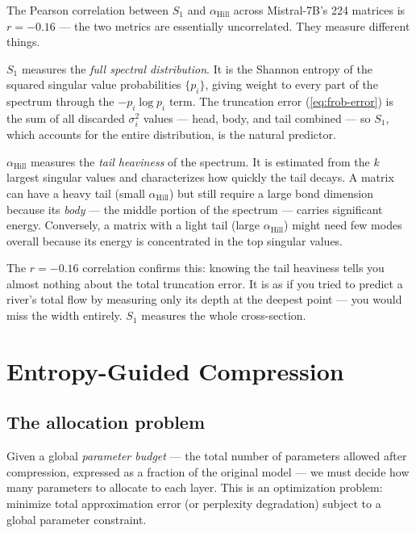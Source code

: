 \documentclass[11pt,a4paper]{article}
\newcommand{\Svn}{S_1}
\begin{document}
The Pearson correlation between $\Svn$ and $\alpha_{\text{Hill}}$
across Mistral-7B's 224 matrices is $r = -0.16$ --- the two metrics
are essentially uncorrelated.  They measure different things.

$\Svn$ measures the \emph{full spectral distribution}.  It is the
Shannon entropy of the squared singular value probabilities
$\{p_i\}$, giving weight to every part of the spectrum through the
$-p_i \log p_i$ term.  The truncation error
(\cref{eq:frob-error}) is the sum of all discarded $\sigma_i^2$
values --- head, body, and tail combined --- so $\Svn$, which
accounts for the entire distribution, is the natural predictor.

$\alpha_{\text{Hill}}$ measures the \emph{tail heaviness} of the
spectrum.  It is estimated from the $k$ largest singular values and
characterizes how quickly the tail decays.  A matrix can have a heavy
tail (small $\alpha_{\text{Hill}}$) but still require a large bond
dimension because its \emph{body} --- the middle portion of the
spectrum --- carries significant energy.  Conversely, a matrix with a
light tail (large $\alpha_{\text{Hill}}$) might need few modes
overall because its energy is concentrated in the top singular values.

The $r = -0.16$ correlation confirms this: knowing the tail heaviness
tells you almost nothing about the total truncation error.  It is as
if you tried to predict a river's total flow by measuring only its
depth at the deepest point --- you would miss the width entirely.
$\Svn$ measures the whole cross-section.


\section{Entropy-Guided Compression}
\label{sec:compression}

\subsection{The allocation problem}
\label{sec:comp-problem}

Given a global \emph{parameter budget} --- the total number of
parameters allowed after compression, expressed as a fraction of the
original model --- we must decide how many parameters to allocate to
each layer.  This is an optimization problem: minimize total
approximation error (or perplexity degradation) subject to a global
parameter constraint.
\end{document}
